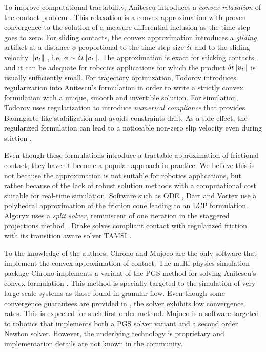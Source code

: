 To improve computational tractability, Anitescu introduces a \textit{convex
relaxation} of the contact problem \cite{bib:anitescu2006}. This relaxation is a
convex approximation with proven convergence to the solution of a measure
differential inclusion as the time step goes to zero. For sliding contacts,
the convex approximation introduces a \emph{gliding} artifact at a distance $\phi$
proportional to the time step size $\delta t$ and to the sliding velocity
$\Vert{\bm{v}}_t\Vert$ \cite{bib:mazhar2014}, i.e. $\phi\sim \delta
t\Vert{\bm{v}}_t\Vert$. The approximation is exact for sticking contacts,
and it can be adequate for robotics applications for which the product $\delta
t\Vert{\bm{v}}_t\Vert$ is usually sufficiently small. For trajectory optimization,
Todorov \cite{bib:todorov2011} introduces regularization into Anitescu's
formulation in order to write a strictly convex formulation with a unique,
smooth and invertible solution. For simulation, Todorov \cite{bib:todorov2014}
uses regularization to introduce \emph{numerical compliance} that provides
Baumgarte-like stabilization and avoids constraints drift. As a side effect, the
regularized formulation can lead to a noticeable non-zero slip velocity even
during stiction \cite{bib:simbenchmark}.

Even though these formulations introduce a tractable approximation of frictional
contact, they haven't become a popular approach in practice. We
believe this is not because the approximation is not suitable for robotics
applications, but rather because of the lack of robust solution methods with a
computational cost suitable for real-time simulation. Software such as ODE
\cite{bib:ode}, Dart \cite{bib:dart} and Vortex \cite{bib:vortex} use a
polyhedral approximation of the friction cone leading to an LCP formulation.
Algoryx \cite{bib:algoryx} uses a \emph{split solver}, reminiscent of one
iteration in the staggered projections method \cite{bib:Kaufman2008}. Drake
\cite{bib:drake} solves compliant contact with regularized friction with its
transition aware solver TAMSI \cite{bib:castro2020}. 

To the knowledge of the authors, Chrono \cite{bib:hrono2016} and Mujoco
\cite{bib:mujoco} are the only software that implement the convex approximation
of contact. The multi-physics simulation package Chrono implements a variant of
the PGS method for solving Anitescu's convex formulation \cite{bib:tasora2011}.
This method is specially targeted to the simulation of very large scale systems
as those found in granular flow. Even though some convergence guarantees are
provided in \cite{bib:anitescu2010}, the solver exhibits low convergence rates.
This is expected for such first order method. Mujoco is a software targeted to
robotics that implements both a PGS solver variant \cite{bib:todorov2014} and a
second order Newton solver. However, the underlying technology is proprietary and
implementation details are not known in the community.

